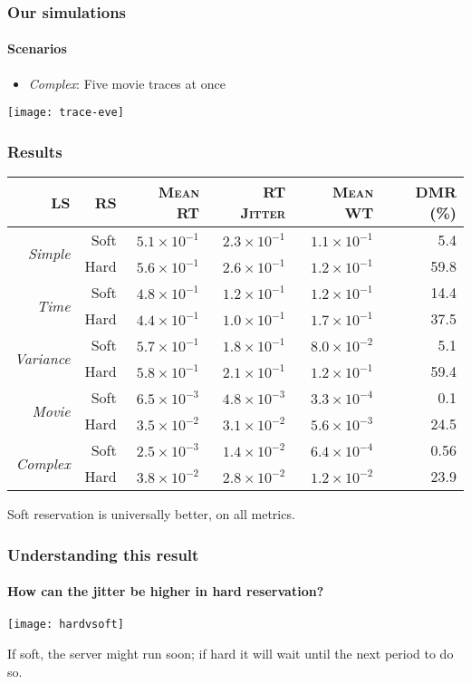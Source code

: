 \documentclass{beamer}
\newcommand{\Lum}{\textit{Simple}}
\newcommand{\Ldois}{\textit{Time}}
\newcommand{\Ltres}{\textit{Variance}}
\newcommand{\Lquatro}{\textit{Movie}}
\newcommand{\Lcinco}{\textit{Complex}}
\begin{document}
\begin{frame}
  \frametitle{Our simulations}
  \framesubtitle{Scenarios}
  \begin{itemize}
  \item \Lcinco{}: Five movie traces at once
  \end{itemize}
  \texttt{[image: trace-eve]}
\end{frame}

\begin{frame}
  \frametitle{Results}
    \begin{tabular}[t]{rrrrrr} \hline
    \textsc{LS} & \textsc{RS} & \textsc{Mean RT} & \textsc{RT Jitter} & \textsc{Mean WT} & \textsc{DMR (\%)} \\ \hline
    \multirow{2}{*}{\Lum{}} & Soft & $5.1\times 10^{-1}$ & $2.3\times 10^{-1}$    & $1.1\times 10^{-1}$   & 5.4  \\
                        & Hard & $5.6\times 10^{-1}$     & $2.6\times 10^{-1}$  & $1.2\times 10^{-1}$   & 59.8 \\ \hline
    \multirow{2}{*}{\Ldois{}} & Soft & $4.8\times 10^{-1}$& $1.2\times 10^{-1}$   & $1.2\times 10^{-1}$   & 14.4 \\
                        & Hard & $4.4\times 10^{-1}$       & $1.0\times 10^{-1}$   & $1.7\times 10^{-1}$   & 37.5 \\ \hline
    \multirow{2}{*}{\Ltres{}} & Soft & $5.7\times 10^{-1}$& $1.8\times 10^{-1}$   & $8.0\times 10^{-2}$   & 5.1  \\
                        & Hard & $5.8\times 10^{-1}$       &$2.1\times 10^{-1}$    & $1.2\times 10^{-1}$   & 59.4 \\ \hline
    \multirow{2}{*}{\Lquatro{}} & Soft & $6.5\times 10^{-3}$& $4.8\times 10^{-3}$   & $3.3\times 10^{-4}$   & 0.1  \\
                        & Hard & $3.5\times 10^{-2}$       & $3.1\times 10^{-2}$   & $5.6\times 10^{-3}$   & 24.5 \\ \hline    
    \multirow{2}{*}{\Lcinco{}} & Soft & $2.5\times 10^{-3}$& $1.4\times 10^{-2}$   & $6.4\times 10^{-4}$   & 0.56  \\
                        & Hard & $3.8\times 10^{-2}$       & $2.8\times 10^{-2}$   & $1.2\times 10^{-2}$   & 23.9 \\ \hline    
  \end{tabular}
Soft reservation is universally better, on all metrics.
\end{frame}

\begin{frame}
  \frametitle{Understanding this result}
  \framesubtitle{How can the jitter be higher in hard reservation?}
    \texttt{[image: hardvsoft]}
    
    \vspace{1cm}
    
    If soft, the server might run soon; if hard it will wait until the
    next period to do so.
\end{frame}
\end{document}
